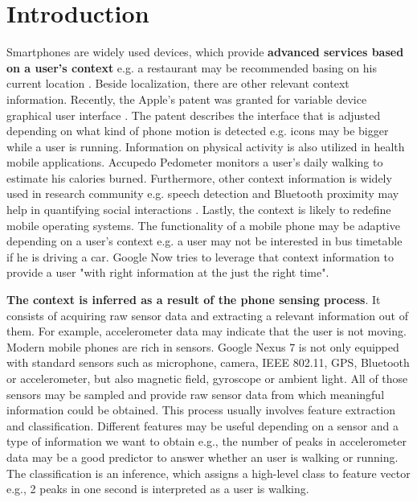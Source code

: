\section{Introduction}
\label{s:intro}
\hspace{10pt} Smartphones are widely used devices, which provide \textbf{advanced services based on a user's context} e.g. a restaurant may be recommended basing on his current location \cite{foursquare:foursquare}. Beside localization, there are other relevant context information. Recently, the Apple's patent was granted for variable device graphical user interface \cite{uspatent:apple}. The patent describes the interface that is adjusted depending on what kind of phone motion is detected e.g. icons may be bigger while a user is running. Information on physical activity is also utilized in health mobile applications. Accupedo Pedometer \cite{googleplay:accupedo} monitors a user's daily walking to estimate his calories burned. Furthermore, other context information is widely used in research community e.g. speech detection and Bluetooth proximity may help in quantifying social interactions \cite{rachuri:socialsense}. Lastly, the context is likely to redefine mobile operating systems. The functionality of a mobile phone may be adaptive depending on a user's context e.g. a user may not be interested in bus timetable if he is driving a car. Google Now \cite{google:googlenow} tries to leverage that context information to provide a user "with right information at the just the right time".

\textbf{The context is inferred as a result of the phone sensing process}. It consists of acquiring raw sensor data and extracting a relevant information out of them. For example, accelerometer data may indicate that the user is not moving. Modern mobile phones are rich in sensors. Google Nexus 7 is not only equipped with standard sensors such as microphone, camera, IEEE 802.11, GPS, Bluetooth or accelerometer, but also magnetic field, gyroscope or ambient light. All of those sensors may be sampled and provide raw sensor data from which meaningful information could be obtained. This process usually involves feature extraction and classification. Different features may be useful depending on a sensor and a type of information we want to obtain e.g., the number of peaks in accelerometer data may be a good predictor to answer whether an user is walking or running. The classification is an inference, which assigns a high-level class to feature vector e.g., 2 peaks in one second is interpreted as a user is walking.

